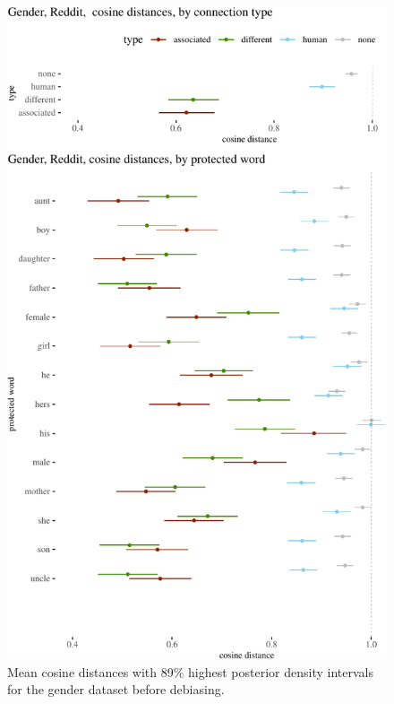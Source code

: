 \documentclass{clv3}
\begin{document}
\begin{figure}

\begin{center}\includegraphics{figures/figdebiasedCosinePair2e} \end{center}
\caption{Mean cosine distances with 89\% highest posterior density intervals for the  gender dataset before debiasing.}
\label{fig:empiricalPriorToDebiasing}
\end{figure}
\end{document}
